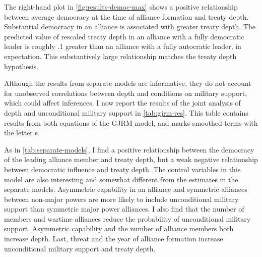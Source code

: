 \documentclass[12pt]{article}
\begin{document}
The right-hand plot in \autoref{fig:results-democ-max} shows a positive relationship between average democracy at the time of alliance formation and treaty depth.
Substantial democracy in an alliance is associated with greater treaty depth. 
The predicted value of rescaled treaty depth in an alliance with a fully democratic leader is roughly .1 greater than an alliance with a fully autocratic leader, in expectation. 
This substantively large relationship matches the treaty depth hypothesis.


Although the results from separate models are informative, they do not account for unobserved correlations between depth and conditions on military support, which could affect inferences. 
I now report the results of the joint analysis of depth and unconditional military support in \autoref{tab:gjrm-res}. 
This table contains results from both equations of the GJRM model, and marks smoothed terms with the letter s. 


As in \autoref{tab:separate-models}, I find a positive relationship between the democracy of the leading alliance member and treaty depth, but a weak negative relationship between democratic influence and treaty depth. 
The control variables in this model are also interesting and somewhat different from the estimates in the separate models.  
Asymmetric capability in an alliance and symmetric alliances between non-major powers are more likely to include unconditional military support than symmetric major power alliances. 
I also find that the number of members and wartime alliances reduce the probability of unconditional military support. 
Asymmetric capability and the number of alliance members both increase depth. 
Last, threat and the year of alliance formation increase unconditional military support and treaty depth. 
\end{document}
